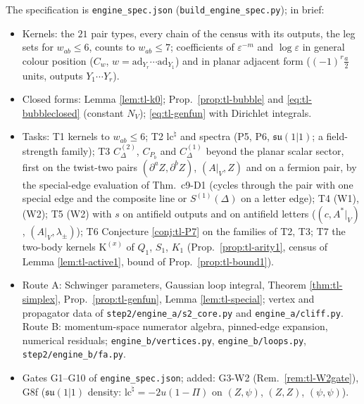 \documentclass[11pt]{article}
\numberwithin{equation}{section}
\theoremstyle{plain}
\theoremstyle{definition}
\begin{document}
The specification is \texttt{engine\_spec.json} (\texttt{build\_engine\_spec.py}); in brief:
\begin{itemize}
\item Kernels: the $21$ pair types, every chain of the census with its outputs, the leg sets for $w_{ab}\le6$, counts to $w_{ab}\le7$; coefficients of $\varepsilon^{-m}$ and $\log\varepsilon$ in general colour position ($C_w$, $w=\mathrm{ad}_{Y_r}\cdots\mathrm{ad}_{Y_1}$) and in planar adjacent form ($(-1)^r\frac{a}2$ units, outputs $Y_1\cdots Y_r$).
\item Closed forms: Lemma \ref{lem:tl-k0}; Prop.~\ref{prop:tl-bubble} and \eqref{eq:tl-bubbleclosed} (constant $N_V$); \eqref{eq:tl-genfun} with Dirichlet integrals.
\item Tasks: T1 kernels to $w_{ab}\le6$; T2 $\mathrm{lc}^\natural$ and spectra (P5, P6, $\mathfrak{su}(1|1)$; a field-strength family); T3 $C^{(2)}_\Delta$, $C_{P_b}$ and $C^{(1)}_\Delta$ beyond the planar scalar sector, first on the twist-two pairs $(\partial^aZ,\partial^bZ)$, $(A|_V,Z)$ and on a fermion pair, by the special-edge evaluation of Thm.~c9-D1 (cycles through the pair with one special edge and the composite line or $S^{(1)}(\Delta)$ on a letter edge); T4 (W1), (W2); T5 (W2) with $s$ on antifield outputs and on antifield letters ($(c,A^*|_V)$, $(A|_V,\lambda_\pm)$); T6 Conjecture \ref{conj:tl-P7} on the families of T2, T3; T7 the two-body kernels $\mathrm K^{(x)}$ of $Q_1$, $S_1$, $K_1$ (Prop.~\ref{prop:tl-arity1}, census of Lemma \ref{lem:tl-active1}, bound of Prop.~\ref{prop:tl-bound1}).
\item Route A: Schwinger parameters, Gaussian loop integral, Theorem \ref{thm:tl-simplex}, Prop.~\ref{prop:tl-genfun}, Lemma \ref{lem:tl-special}; vertex and propagator data of \texttt{step2/engine\_a/s2\_core.py} and \texttt{engine\_a/cliff.py}. Route B: momentum-space numerator algebra, pinned-edge expansion, numerical residuals; \texttt{engine\_b/vertices.py}, \texttt{engine\_b/loops.py}, \texttt{step2/engine\_b/fa.py}.
\item Gates G1--G10 of \texttt{engine\_spec.json}; added: G3-W2 (Rem.~\ref{rem:tl-W2gate}), G8f ($\mathfrak{su}(1|1)$ density: $\mathrm{lc}^\natural=-2u(1-\Pi)$ on $(Z,\psi)$, $(Z,Z)$, $(\psi,\psi)$).
\end{itemize}
\end{document}
